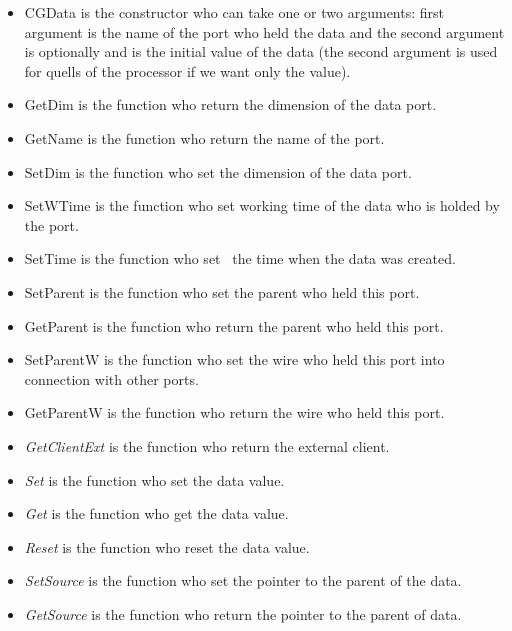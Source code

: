 \documentclass[a4paper,oneside,notitlepage]{article}
\begin{document}
\begin{itemize}
\item CGData is the constructor who can take one or two arguments: first
argument is the name of the port who held the data and the second argument
is optionally and is the initial value of the data (the second argument is
used for quells of the processor if we want only the value).

\item GetDim is the function who return the dimension of the data port.

\item GetName is the function who return the name of the port.

\item SetDim is the function who set the dimension of the data port.

\item SetWTime is the function who set working time of the data who is
holded by the port.

\item SetTime is the function who set \ the time when the data was created.

\item SetParent is the function who set the parent who held this port.

\item GetParent is the function who return the parent who held this port.

\item SetParentW is the function who set the wire who held this port into
connection with other ports.

\item GetParentW is the function who return the wire who held this port.

\item \textit{GetClientExt} is the function who return the external client.

\item \textit{Set} is the function who set the data value.

\item \textit{Get} is the function who get the data value.

\item \textit{Reset} is the function who reset the data value.

\item \textit{SetSource} is the function who set the pointer to the parent
of the data.

\item \textit{GetSource} is the function who return the pointer to the
parent of data.
\end{itemize}
\end{document}
